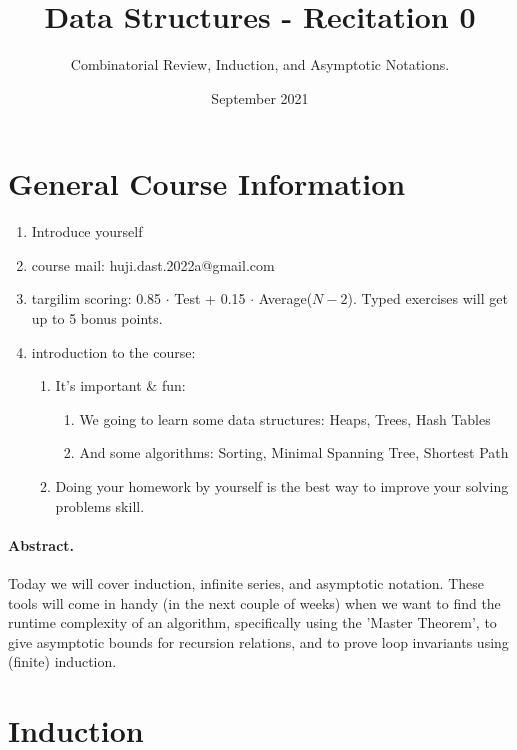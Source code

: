 \title{Data Structures - Recitation 0} 
\author{Combinatorial Review, Induction, and Asymptotic Notations.}
\date{September 2021}


\section{General Course Information}
\begin{enumerate}
    \item Introduce yourself
    \item course mail: huji.dast.2022a@gmail.com
    \item targilim scoring: 0.85 \( \cdot \) Test + 0.15 \( \cdot \) Average(\(N - 2\)). Typed exercises will get up to 5 bonus points. 
\item  introduction to the course: \begin{enumerate}
    \item  It’s important \& fun: \begin{enumerate}
        \item We going to learn some data structures: Heaps, Trees, Hash Tables
        \item And some algorithms: Sorting, Minimal Spanning Tree, Shortest Path
    \end{enumerate}
    \item Doing your homework by yourself is the best way to improve your solving problems skill.
\end{enumerate}
\end{enumerate}

\paragraph{Abstract.} Today we will cover induction, infinite series, and asymptotic notation. These tools will come in handy (in the next couple of weeks) when we want to find the runtime complexity of an algorithm, specifically using the ’Master Theorem’, to give asymptotic bounds for recursion relations, and to prove loop invariants using (finite) induction.

\section{Induction}
